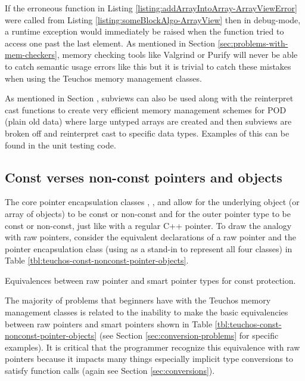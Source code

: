 \documentclass[pdf,ps2pdf,11pt]{SANDreport}
\begin{document}
If the erroneous {} function in Listing
{}\ref{listing:addArrayIntoArray-ArrayViewError} were called from
Listing {}\ref{listing:someBlockAlgo-ArrayView} then in debug-mode, a
runtime exception would immediately be raised when the
{} function tried to access one past
the last element.  As mentioned in Section
{}\ref{sec:problems-with-mem-checkers}, memory checking tools like
Valgrind or Purify will never be able to catch semantic usage errors
like this but it is trivial to catch these mistakes when using the
Teuchos memory management classes.

As mentioned in Section {}, subviews can also
be used along with the reinterpret cast functions to create very
efficient memory management schemes for POD (plain old data) where
large untyped {} arrays are created and then subviews are
broken off and reinterpret cast to specific data types.  Examples of
this can be found in the unit testing code.


%
{}\subsection{Const verses non-const pointers and objects}
\label{sec:teuchos-const-nonconst-pointer-objects}
%

The core pointer encapsulation classes {},
{}, {} and {} allow for
the underlying object (or array of objects) to be const or non-const
and for the outer pointer type to be const or non-const, just like
with a regular C++ pointer.  To draw the analogy with raw pointers,
consider the equivalent declarations of a raw pointer and the pointer
encapsulation class (using {} as a stand-in to represent
all four classes) in Table
{}\ref{tbl:teuchos-const-nonconst-pointer-objects}.

\begin{table}
%
\begin{center}
%
%

%
%
\end{center}
\caption{\label{tbl:teuchos-const-nonconst-pointer-objects}
Equivalences between raw pointer and smart pointer types for const
protection.}
%
\end{table}

The majority of problems that beginners have with the Teuchos memory
management classes is related to the inability to make the basic
equivalencies between raw pointers and smart pointers shown in Table
{}\ref{tbl:teuchos-const-nonconst-pointer-objects} (see Section
{}\ref{sec:conversion-problems} for specific examples).  It is
critical that the programmer recognize this equivalence with raw
pointers because it impacts many things especially implicit type
conversions to satisfy function calls (again see Section
{}\ref{sec:conversions}).
\end{document}
